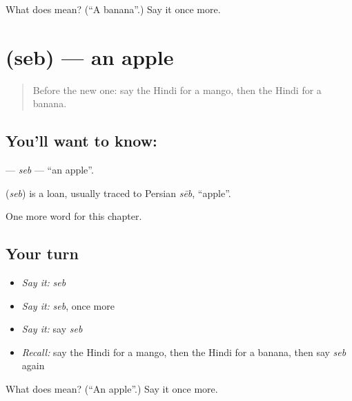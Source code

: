 \begin{tcolorbox}[breakable,colback=teal!4,colframe=teal!35!black,title={Before you move on}]
What does  mean? (\textquotedblleft{}A banana\textquotedblright{}.) Say it once more.
\end{tcolorbox}
\section[\texorpdfstring{\hi{सेब} (seb)}{सेब (seb)}]{ (seb) — an apple}

\label{lesson:HI-C139-seb}



\begin{quote}
Before the new one: say the Hindi for a mango, then the Hindi for a banana.
\end{quote}

\subsection*{You'll want to know: }
\textbf{} — \emph{seb} — \textquotedblleft{}an apple\textquotedblright{}.

\begin{cousinweb}
\textbf{} (\emph{seb}) is a loan, usually traced to Persian \emph{sēb}, \textquotedblleft{}apple\textquotedblright{}.
\end{cousinweb}

\begin{grammarlens}[title={What you've built}]
One more word for this chapter.
\end{grammarlens}

\subsection*{Your turn}
\begin{itemize}
\raggedright
  \item \emph{Say it:} \emph{seb}
  \item \emph{Say it:} \emph{seb}, once more
  \item \emph{Say it:} say \emph{seb}
  \item \emph{Recall:} say the Hindi for a mango, then the Hindi for a banana, then say \emph{seb} again
\end{itemize}

\begin{tcolorbox}[breakable,colback=teal!4,colframe=teal!35!black,title={Before you move on}]
What does  mean? (\textquotedblleft{}An apple\textquotedblright{}.) Say it once more.
\end{tcolorbox}
